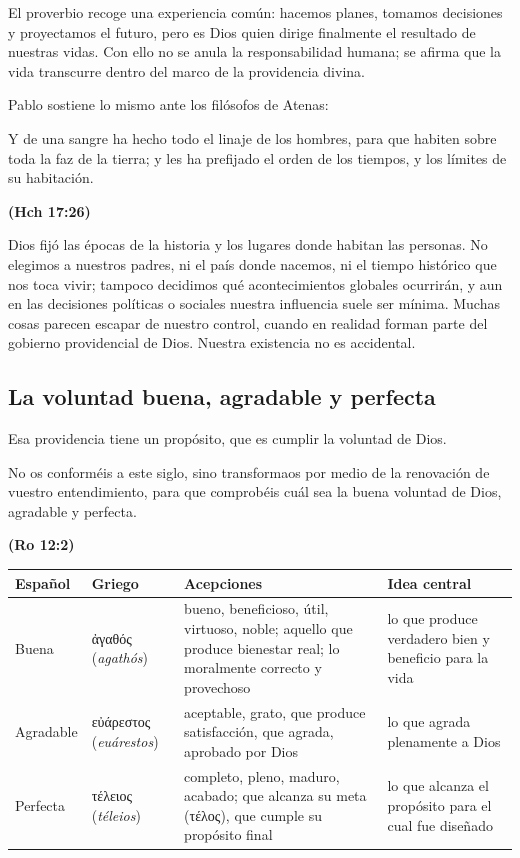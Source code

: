\documentclass[11pt,letterpaper]{article}
\newcommand{\grc}[1]{\foreignlanguage{ancientgreek}{#1}}
\newcommand{\fuente}[1]{\par\hfill{\upshape\bfseries\small\textcolor{azul}{#1}}}
\begin{document}
El proverbio recoge una experiencia común: hacemos planes, tomamos decisiones y proyectamos el futuro, pero es Dios quien dirige finalmente el resultado de nuestras vidas. Con ello no se anula la responsabilidad humana; se afirma que la vida transcurre dentro del marco de la providencia divina.

Pablo sostiene lo mismo ante los filósofos de Atenas:

\begin{cita}Y de una sangre ha hecho todo el linaje de los hombres, para que habiten sobre toda la faz de la tierra; y les ha prefijado el orden de los tiempos, y los límites de su habitación.\fuente{(Hch 17:26)}\end{cita}

Dios fijó las épocas de la historia y los lugares donde habitan las personas. No elegimos a nuestros padres, ni el país donde nacemos, ni el tiempo histórico que nos toca vivir; tampoco decidimos qué acontecimientos globales ocurrirán, y aun en las decisiones políticas o sociales nuestra influencia suele ser mínima. Muchas cosas parecen escapar de nuestro control, cuando en realidad forman parte del gobierno providencial de Dios. Nuestra existencia no es accidental.

\subsection{La voluntad buena, agradable y perfecta}

Esa providencia tiene un propósito, que es cumplir la voluntad de Dios.

\begin{cita}No os conforméis a este siglo, sino transformaos por medio de la renovación de vuestro entendimiento, para que comprobéis cuál sea la buena voluntad de Dios, agradable y perfecta.\fuente{(Ro 12:2)}\end{cita}

\begin{center}\small\renewcommand{\arraystretch}{1.25}
\begin{tabular}{@{}L{1.8cm}L{2.6cm}L{6.0cm}L{4.0cm}@{}}
\toprule
\textbf{Español} & \textbf{Griego} & \textbf{Acepciones} & \textbf{Idea central} \\ \midrule
Buena & \grc{ἀγαθός} (\emph{agathós}) & bueno, beneficioso, útil, virtuoso, noble; aquello que produce bienestar real; lo moralmente correcto y provechoso & lo que produce verdadero bien y beneficio para la vida \\
Agradable & \grc{εὐάρεστος} (\emph{euárestos}) & aceptable, grato, que produce satisfacción, que agrada, aprobado por Dios & lo que agrada plenamente a Dios \\
Perfecta & \grc{τέλειος} (\emph{téleios}) & completo, pleno, maduro, acabado; que alcanza su meta (\grc{τέλος}), que cumple su propósito final & lo que alcanza el propósito para el cual fue diseñado \\
\bottomrule
\end{tabular}\end{center}
\end{document}
